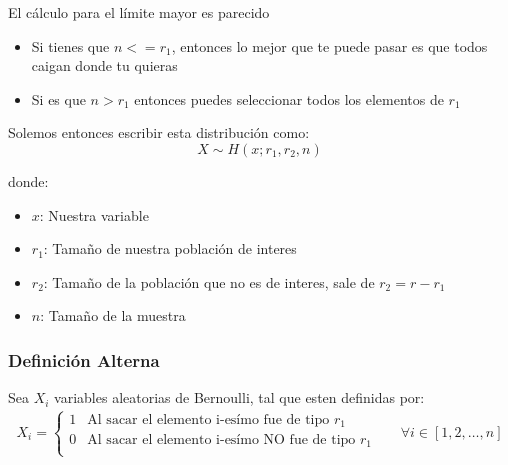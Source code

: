 \documentclass[12pt, fleqn]{report}                             %
\DeclareMathOperator \Space {\quad}                             %
\theoremstyle{break}                                            %
\begin{document}
                    El cálculo para el límite mayor es parecido
                    \begin{itemize}
                        \item 
                            Si tienes que $n <= r_1$, entonces lo mejor que te puede pasar es que todos
                            caigan donde tu quieras
                        \item
                            Si es que $n > r_1$ entonces puedes seleccionar todos los elementos de $r_1$
                    \end{itemize}

                    \clearpage

                    Solemos entonces escribir esta distribución como:
                    \begin{equation*}
                        X \sim H(x; r_1, r_2, n)
                    \end{equation*}

                    donde:
                    \begin{itemize}
                        \item $x$: Nuestra variable
                        \item $r_1$: Tamaño de nuestra población de interes
                        \item $r_2$: Tamaño de la población que no es de interes, sale de $r_2 = r - r_1$
                        \item $n$: Tamaño de la muestra
                    \end{itemize}


                \vspace{1em}
                \subsubsection{Definición Alterna}

                    Sea $X_i$ variables aleatorias de Bernoulli, tal que esten
                    definidas por: 
                    \begin{align*}
                        X_i = 
                            \begin{cases}
                                1 & \text{Al sacar el elemento i-esímo fue de tipo $r_1$}        \\
                                0 & \text{Al sacar el elemento i-esímo NO fue de tipo $r_1$}     \\
                            \end{cases}
                            \Space
                            \forall i \in [1, 2, \dots, n]
                    \end{align*}
\end{document}
